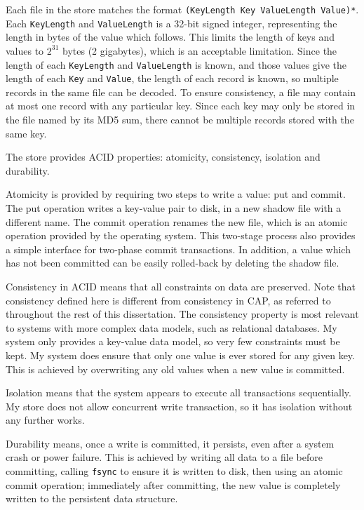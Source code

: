 \documentclass[12pt,a4paper,twoside,openany]{report}
\begin{document}
Each file in the store matches the format \verb|(KeyLength Key ValueLength Value)*|. Each \verb|KeyLength| and \verb|ValueLength| is a 32-bit signed integer, representing the length in bytes of the value which follows. This limits the length of keys and values to $2^{31}$ bytes (2 gigabytes), which is an acceptable limitation. Since the length of each \verb|KeyLength| and \verb|ValueLength| is known, and those values give the length of each \verb|Key| and \verb|Value|, the length of each record is known, so multiple records in the same file can be decoded. To ensure consistency, a file may contain at most one record with any particular key. Since each key may only be stored in the file named by its MD5 sum, there cannot be multiple records stored with the same key.

The store provides ACID properties: atomicity, consistency, isolation and durability.

Atomicity is provided by requiring two steps to write a value: put and commit. The put operation writes a key-value pair to disk, in a new shadow file with a different name. The commit operation renames the new file, which is an atomic operation provided by the operating system. This two-stage process also provides a simple interface for two-phase commit transactions. In addition, a value which has not been committed can be easily rolled-back by deleting the shadow file.

Consistency in ACID means that all constraints on data are preserved. Note that consistency defined here is different from consistency in CAP, as referred to throughout the rest of this dissertation. The consistency property is most relevant to systems with more complex data models, such as relational databases. My system only provides a key-value data model, so very few constraints must be kept. My system does ensure that only one value is ever stored for any given key. This is achieved by overwriting any old values when a new value is committed.

Isolation means that the system appears to execute all transactions sequentially. My store does not allow concurrent write transaction, so it has isolation without any further works.

Durability means, once a write is committed, it persists, even after a system crash or power failure. This is achieved by writing all data to a file before committing, calling \verb|fsync| to ensure it is written to disk, then using an atomic commit operation; immediately after committing, the new value is completely written to the persistent data structure.
\end{document}
